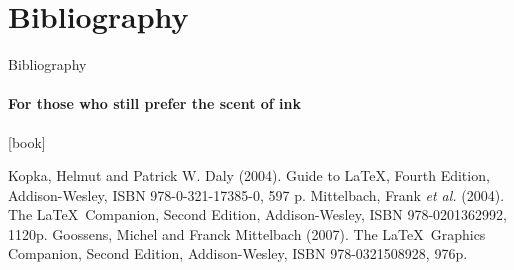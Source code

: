 \scriptsize

\section{Bibliography}

\begin{frame}[c]{Bibliography}
	\framesubtitle{For those who still prefer the scent of ink}
	[book]
		
	\begin{thebibliography}{99}		
			Kopka, Helmut and Patrick W. Daly (2004).
			\newblock Guide to \LaTeX, Fourth Edition,
			\newblock Addison-Wesley,
			\newblock ISBN 978-0-321-17385-0, 597 p.
			Mittelbach, Frank \emph{et al.} (2004).
			\newblock The \LaTeX\ Companion, Second Edition,
			\newblock Addison-Wesley,
			\newblock ISBN 978-0201362992, 1120p.
			Goossens, Michel and Franck Mittelbach (2007).
			\newblock The \LaTeX\ Graphics Companion, Second Edition,
			\newblock Addison-Wesley,
			\newblock ISBN 978-0321508928, 976p.
	\end{thebibliography}

\end{frame}

